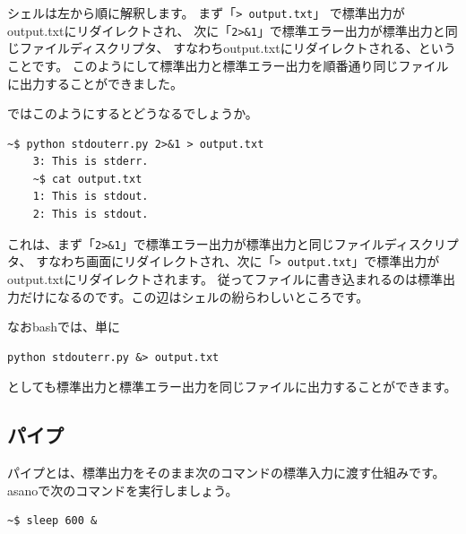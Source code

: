 \documentclass[a4j]{ltjsreport}
\begin{document}
    シェルは左から順に解釈します。
    まず「\texttt{> output.txt}」 で標準出力がoutput.txtにリダイレクトされ、
    次に「\texttt{2>\&1}」で標準エラー出力が標準出力と同じファイルディスクリプタ、
    すなわちoutput.txtにリダイレクトされる、ということです。
    このようにして標準出力と標準エラー出力を順番通り同じファイルに出力することができました。

    ではこのようにするとどうなるでしょうか。
    \begin{lstlisting}[numbers=none]
    ~$ python stdouterr.py 2>&1 > output.txt
    3: This is stderr.
    ~$ cat output.txt
    1: This is stdout.
    2: This is stdout.
    \end{lstlisting}

    これは、まず「\texttt{2>\&1}」で標準エラー出力が標準出力と同じファイルディスクリプタ、
    すなわち画面にリダイレクトされ、次に「\texttt{> output.txt}」で標準出力がoutput.txtにリダイレクトされます。
    従ってファイルに書き込まれるのは標準出力だけになるのです。この辺はシェルの紛らわしいところです。

    なおbashでは、単に
    \begin{lstlisting}[numbers=none]
    python stdouterr.py &> output.txt
    \end{lstlisting}
    としても標準出力と標準エラー出力を同じファイルに出力することができます。

    \subsection{パイプ}
    パイプとは、標準出力をそのまま次のコマンドの標準入力に渡す仕組みです。
    asanoで次のコマンドを実行しましょう。
    \begin{lstlisting}[numbers=none]
    ~$ sleep 600 &
    \end{lstlisting}
\end{document}
